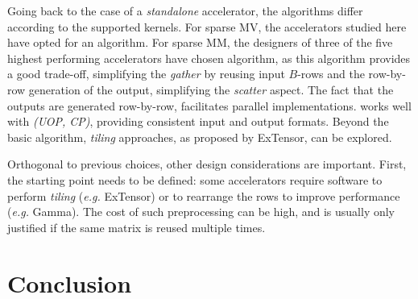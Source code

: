 Going back to the case of a \emph{standalone} accelerator, the algorithms differ according to the supported kernels. For sparse MV, the accelerators studied here have opted for an  algorithm. For sparse MM, the designers of three of the five highest performing accelerators have chosen  algorithm, as this algorithm provides a good trade-off, simplifying the \emph{gather} by reusing input $B$-rows and the row-by-row generation of the output, simplifying the \emph{scatter} aspect. The fact that the outputs are generated row-by-row, facilitates parallel implementations.  works well with \emph{(UOP, CP)}, providing consistent input and output formats. Beyond the basic algorithm, \emph{tiling} approaches, as proposed by ExTensor, can be explored.

Orthogonal to previous choices, other design considerations are important. First, the starting point needs to be defined: some accelerators require software to perform \emph{tiling} (\emph{e.g.} ExTensor) or to rearrange the rows to improve performance (\emph{e.g.} Gamma). The cost of such preprocessing can be high, and is usually only justified if the same matrix is reused multiple times.


\section{Conclusion}
\label{sec:soa:conclusions}


